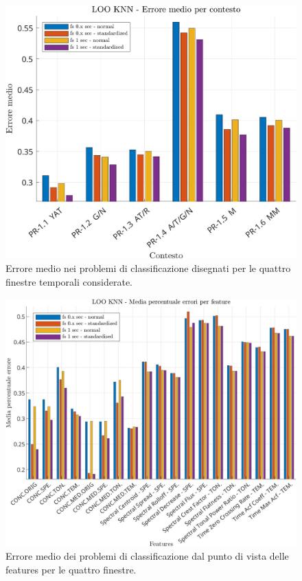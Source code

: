 \begin{center}	
	\begin{figure}[htp]
		\centering
		\includegraphics[width=1\textwidth]{img/cap4-classificazione_fase1_binaria.jpg}
		\caption{Errore medio nei problemi di classificazione disegnati per le quattro finestre temporali considerate.}
		\label{fig4.3}
	\end{figure}
\end{center}	
\begin{center}	
	\begin{figure}[htp]
		\centering
		\includegraphics[width=1\textwidth]{img/cap4-classificazione_fase1_features.jpg}
		\caption{Errore medio dei problemi di classificazione dal punto di vista delle features per le quattro finestre.}
		\label{fig4.4}
	\end{figure}
\end{center}

